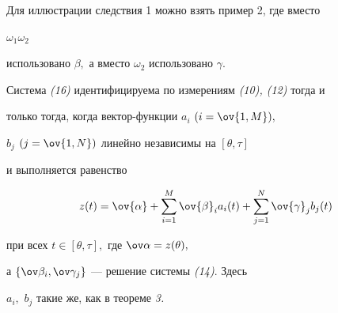 Для иллюстрации следствия 1 можно взять пример 2, где вместо


$\omega_1\omega_2$


использовано $\beta,$ а вместо $\omega_2$ использовано $\gamma.$





\begin{thm}


Система {\em (16)} идентифицируема по измерениям {\em (10), (12)} тогда и


только тогда, когда вектор-функции $a_i$ $(i=\ov{1,M}),$


$b_j$ $(j=\ov{1,N})$ линейно независимы на $[\theta,\tau]$


и выполняется равенство


$$


z(t)=\ov{\alpha} +


\sum_{i=1}^M\ov{\beta}_i a_i(t) +


\sum_{j=1}^N\ov{\gamma}_j b_j(t)


$$


при всех $t\in[\theta,\tau],$ где $\ov\alpha=z(\theta),$


а $\{\ov\beta_i,\ov\gamma_j\}$ --- решение системы {\em (14)}. Здесь


$a_i,$ $b_j$ такие же, как в теореме {\em 3.}


\end{thm}





